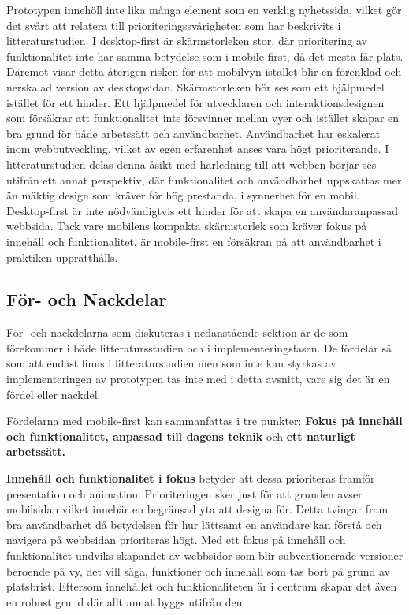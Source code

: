 \documentclass[11pt]{article}
\begin{document}
Prototypen innehöll inte lika många element som en verklig nyhetssida, vilket gör det svårt att relatera till prioriteringssvårigheten som har beskrivits i litteraturstudien. I desktop-first är skärmstorleken stor, där prioritering av funktionalitet inte har samma betydelse som i mobile-first, då det mesta får plats. Däremot visar detta återigen risken för att mobilvyn istället blir en förenklad och nerskalad version av desktopsidan. Skärmstorleken bör ses som ett hjälpmedel istället för ett hinder. Ett hjälpmedel för utvecklaren och interaktionsdesignen som försäkrar att funktionalitet inte försvinner mellan vyer och istället skapar en bra grund för både arbetssätt och användbarhet. Användbarhet har eskalerat inom webbutveckling, vilket av egen erfarenhet anses vara högt prioriterande. I litteraturstudien delas denna åsikt med härledning till att webben börjar ses utifrån ett annat perspektiv, där funktionalitet och användbarhet uppskattas mer än mäktig design som kräver för hög prestanda, i synnerhet för en mobil. Desktop-first är inte nödvändigtvis ett hinder för att skapa en användaranpassad webbsida. Tack vare mobilens kompakta skärmstorlek som kräver fokus på innehåll och funktionalitet, är mobile-first en försäkran på att användbarhet i praktiken upprätthålls.

\subsection{För- och Nackdelar}
För- och nackdelarna som diskuteras i nedanstående sektion är de som förekommer i både litteratursstudien och i implementeringsfasen. De fördelar så som att endast finns i litteraturstudien men som inte kan styrkas av implementeringen av prototypen tas inte med i detta avsnitt, vare sig det är en fördel eller nackdel.

Fördelarna med mobile-first kan sammanfattas i tre punkter: \textbf{Fokus på innehåll och funktionalitet, anpassad till dagens teknik} och \textbf{ett naturligt arbetssätt.} 

\textbf{Innehåll och funktionalitet i fokus} betyder att dessa prioriteras framför presentation och animation. Prioriteringen sker just för att grunden avser mobilsidan vilket innebär en begränsad yta att designa för. Detta tvingar fram bra användbarhet då betydelsen för hur lättsamt en användare kan förstå och navigera på webbsidan prioriteras högt. Med ett fokus på innehåll och funktionalitet undviks skapandet av webbsidor som blir subventionerade versioner beroende på vy, det vill säga, funktioner och innehåll som tas bort på grund av platsbrist. Eftersom innehållet och funktionaliteten är i centrum skapar det även en robust grund där allt annat byggs utifrån den.
\end{document}
